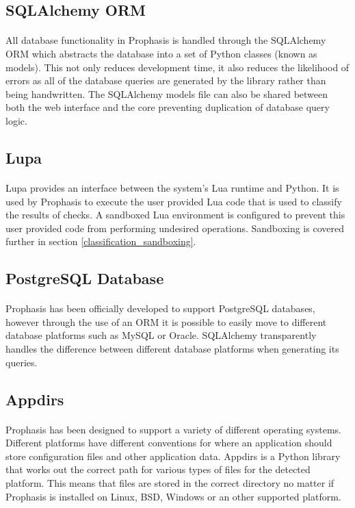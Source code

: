 \documentclass[bsc,logo,twoside,singlespacing,notimes]{infthesis}
\begin{document}
\subsection{SQLAlchemy ORM}
\paragraph*{}
	All database functionality in Prophasis is handled through the SQLAlchemy ORM
	which abstracts the database into a set of Python classes (known as models).
	This not only reduces development time, it also reduces the likelihood of
	errors as all of the database queries are generated by the library rather than
	being handwritten.  The SQLAlchemy models file can also be shared between both
	the web interface and the core preventing duplication of database query logic.

\subsection{Lupa}
\paragraph*{}
	Lupa provides an interface between the system's Lua runtime and Python.  It is
	used by Prophasis to execute the user provided Lua code that is used to
	classify the results of checks. A sandboxed Lua environment is configured to
	prevent this user provided code from performing undesired operations.
	Sandboxing is covered further in section \ref{classification_sandboxing}.

\subsection{PostgreSQL Database}
\paragraph*{}
	Prophasis has been officially developed to support PostgreSQL databases,
	however through the use of an ORM it is possible to easily move to different
	database platforms such as MySQL or Oracle.  SQLAlchemy transparently handles
	the difference between different database platforms when generating its
	queries.
	
\subsection{Appdirs}
\paragraph*{}
	Prophasis has been designed to support a variety of different operating
	systems.  Different platforms have different conventions for where an
	application should store configuration files and other application data.
	Appdirs is a Python library that works out the correct path for various types
	of files for the detected platform.  This means that files are stored in the
	correct directory no matter if Prophasis is installed on Linux, BSD, Windows
	or an other supported platform.
\end{document}
